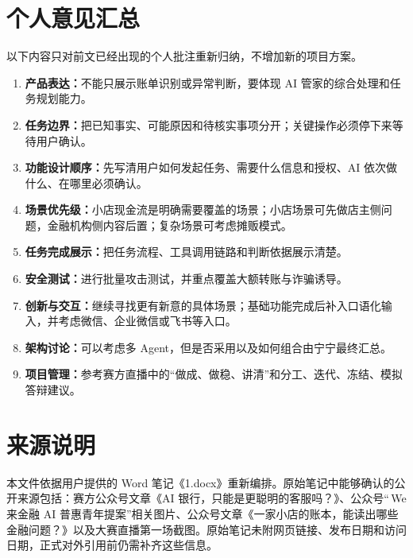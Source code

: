 \documentclass[UTF8,11pt,a4paper,fontset=fandol]{ctexart}
\begin{document}
\section{个人意见汇总}
以下内容只对前文已经出现的个人批注重新归纳，不增加新的项目方案。
\begin{enumerate}
  \item \textbf{产品表达：}不能只展示账单识别或异常判断，要体现 AI 管家的综合处理和任务规划能力。
  \item \textbf{任务边界：}把已知事实、可能原因和待核实事项分开；关键操作必须停下来等待用户确认。
  \item \textbf{功能设计顺序：}先写清用户如何发起任务、需要什么信息和授权、AI 依次做什么、在哪里必须确认。
  \item \textbf{场景优先级：}小店现金流是明确需要覆盖的场景；小店场景可先做店主侧问题，金融机构侧内容后置；复杂场景可考虑摊贩模式。
  \item \textbf{任务完成展示：}把任务流程、工具调用链路和判断依据展示清楚。
  \item \textbf{安全测试：}进行批量攻击测试，并重点覆盖大额转账与诈骗诱导。
  \item \textbf{创新与交互：}继续寻找更有新意的具体场景；基础功能完成后补入口语化输入，并考虑微信、企业微信或飞书等入口。
  \item \textbf{架构讨论：}可以考虑多 Agent，但是否采用以及如何组合由宁宁最终汇总。
  \item \textbf{项目管理：}参考赛方直播中的“做成、做稳、讲清”和分工、迭代、冻结、模拟答辩建议。
\end{enumerate}

\section*{来源说明}
本文件依据用户提供的 Word 笔记《1.docx》重新编排。原始笔记中能够确认的公开来源包括：赛方公众号文章《AI 银行，只能是更聪明的客服吗？》、公众号“\,We 来金融 AI 普惠青年提案”相关图片、公众号文章《一家小店的账本，能读出哪些金融问题？》以及大赛直播第一场截图。原始笔记未附网页链接、发布日期和访问日期，正式对外引用前仍需补齐这些信息。
\end{document}
